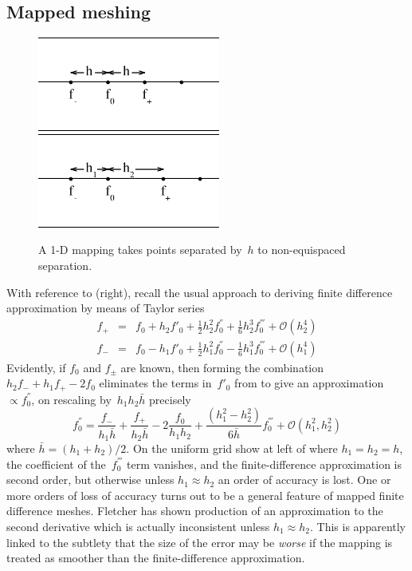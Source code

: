 \subsection{Mapped meshing}\label{sec:mapped}
\begin{figure}
\centerline{\includegraphics[width=6cm]{../pics/basic}
\includegraphics[width=6cm]{../pics/basic2}
}
\caption{A 1-D mapping takes points separated by~$h$ to non-equispaced separation.
\label{fig:basic}}
\end{figure}
With reference to (right),
recall the usual approach to deriving finite difference approximation by
means of Taylor series
\begin{eqnarray} \label{eq:taylor}
f_+&=&f_0 + h_2 f'_0 + \frac{1}{2} h_2^2 f^{''}_0 + \frac{1}{6} h_2^3 f^{'''}_0 + \mathcal{O}(h_2^4)\\
f_-&=&f_0 - h_1 f'_0 + \frac{1}{2} h_1^2 f^{''}_0 - \frac{1}{6} h_1^3 f^{'''}_0 + \mathcal{O}(h_1^4)
\end{eqnarray}
Evidently, if $f_0$ and $f_\pm$ are known, then forming the combination 
$h_2 f_- + h_1 f_+ - 2f_0$ eliminates the terms in~$f'_0$ from 
to give an approximation $\propto f^{''}_0$,
on rescaling by~$h_1 h_2 \bar{h}$ precisely
\begin{equation} \label{eq:ddf}
f^{''}_0 = \frac{f_-}{h_1 \bar{h}} +  \frac{f_+}{h_2 \bar{h}} -2 \frac{f_0}{h_1 h_2} + \frac{(h_1^2-h_2^2)}{6\bar{h}} f^{'''}_0 + \mathcal{O}(h_1^2,h_2^2)
\end{equation}
where $\bar{h} = (h_1+h_2)/2$. On the uniform grid show at left of 
where $h_1=h_2=h$, the coefficient of the~$f^{'''}_0$
term vanishes, and the finite-difference approximation is second order, but otherwise unless $h_1\approx h_2$
an order of accuracy is lost. 
One or more orders of loss of accuracy turns out to be a general feature of mapped
finite difference meshes.  Fletcher %
has shown production of an approximation to the second derivative
which is actually inconsistent unless $h_1\approx h_2$.
This is apparently linked to the subtlety that the size of
the error may be \emph{worse} if the mapping is treated as smoother than the finite-difference approximation.

